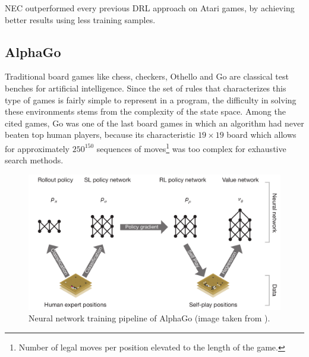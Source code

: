 NEC outperformed every previous DRL approach on Atari games, by achieving better
results using less training samples.

\subsection{AlphaGo} \label{s:alphago}
Traditional board games like chess, checkers, Othello and Go are classical 
test benches for artificial intelligence. Since the set of rules that
characterizes this type of games is fairly simple to represent in a program, the
difficulty in solving these environments stems from the complexity of the 
state space. Among the cited games, Go was one of the last board games in which 
an algorithm had never beaten top human players, because its characteristic 
$19 \times 19$ board which allows for approximately $250^{150}$ sequences of
moves\footnote{Number of legal moves per position elevated to the length of the 
game.} was too complex for exhaustive search methods.
%
\begin{figure}
    \includegraphics[width=\textwidth]{pictures/alphago}
    \centering
    \caption[Neural network training pipeline of AlphaGo]{Neural network 
	    training pipeline of AlphaGo (image taken from \cite{silver2016mastering}).}
    \label{f:alphago}
\end{figure}
%

